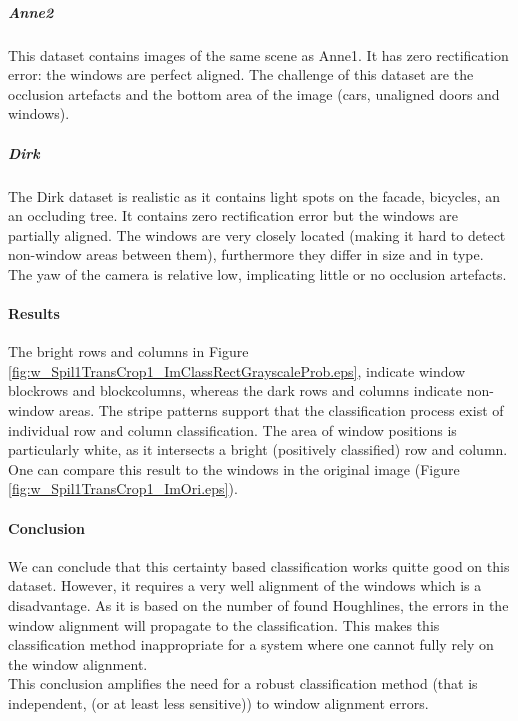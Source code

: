 \subparagraph{Anne2}
This dataset contains images of the same scene as Anne1.
It has zero rectification error: the windows are perfect aligned. The challenge
of this dataset are the occlusion artefacts and the 
bottom area of the image (cars, unaligned doors and windows).

\subparagraph{Dirk}
The Dirk dataset is realistic as it contains light spots on the facade,
bicycles, an an occluding tree.  It contains zero rectification error but the
windows are partially aligned.  The windows are very closely located (making it
hard to detect non-window areas between them), furthermore they differ in size
and in type.  The yaw of the camera is relative low, implicating little or no
occlusion artefacts.

\paragraph{Results} %
\newpage
{}

The bright rows and columns in Figure
\ref{fig:w_Spil1TransCrop1_ImClassRectGrayscaleProb.eps},  indicate window
blockrows and blockcolumns, whereas the dark rows and columns indicate
non-window areas.
The stripe patterns support that the classification process exist of individual
row and column classification.
The area of window positions is particularly white, as it 
intersects a bright (positively classified) row and column.
One can compare this result to the windows in the original image 
(Figure \ref{fig:w_Spil1TransCrop1_ImOri.eps}).



\paragraph{Conclusion}
We can conclude that this certainty based classification works quitte good on
this dataset.  However, it requires a very well alignment of the windows which
is a disadvantage.  As it is based on the number of found Houghlines, the
errors in the window alignment will propagate to the classification.  This
makes this classification method inappropriate for a system where one cannot
fully rely on the window alignment.  \\
This conclusion amplifies the need for a robust classification method (that is
independent, (or at least less sensitive)) to window alignment errors.


